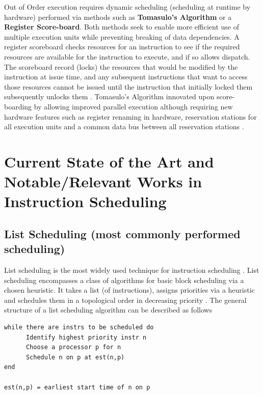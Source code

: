 \documentclass[12pt]{report}
\def\mytitle{??? Program Code ???}
\begin{document}
Out of Order execution requires dynamic scheduling (scheduling at runtime by
hardware) performed via methods such as \textbf{Tomasulo's Algorithm} or a \textbf{Register
Score-board}. Both methods seek to enable more efficient use of multiple
execution units while preventing breaking of data dependencies. A register
scoreboard checks resources for an instruction to see if the required
resources are available for the instruction to execute, and if so allows
dispatch. The scoreboard record (locks) the resources that would be modified
by the instruction at issue time, and any subsequent instructions that want to
access those resources cannot be issued until the instruction that initially
locked them subsequently unlocks them \parencite{popescu1997processor}.
Tomasulo's Algorithm innovated upon score-boarding by allowing improved parallel
execution although requiring new hardware features such as register renaming
in hardware, reservation stations for all execution units and a common data
bus between all reservation stations \parencite{tomasulo1967efficient}.

\chapter{Current State of the Art and Notable/Relevant Works in Instruction Scheduling}
\label{sec:orga7c7dc7}
\section{List Scheduling (most commonly performed scheduling)}
\label{sec:orgd9cd63e}
List scheduling is the most widely used technique for instruction scheduling
\parencite{gibbons1986efficient}. List scheduling encompasses a class of
algorithms for basic block scheduling via a chosen heuristic. It takes a list (of
instructions), assigns priorities via a heuristic and schedules them in a
topological order in decreasing priority \parencite{wang2018list}. The
general structure of a list scheduling algorithm can be described as follows

\def\mytitle{{\sc Basic Structure of List Scheduling Algorithms \hspace{12em} \color{grey}{.} }}
\begin{verbatim}
while there are instrs to be scheduled do 
      Identify highest priority instr n
      Choose a processor p for n
      Schedule n on p at est(n,p)
end

est(n,p) = earliest start time of n on p
\end{verbatim}
\end{document}
